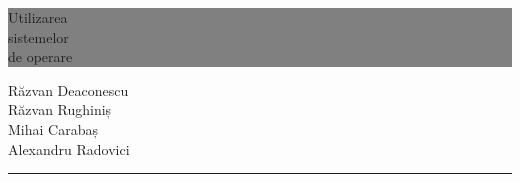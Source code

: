
\begin{titlepage} %


  \colorbox{grey}{
    \parbox[t]{0.93\textwidth}{ %
      \parbox[t]{0.91\textwidth}{ %
        \raggedleft %
        \fontsize{50pt}{80pt}\selectfont %
        \vspace{0.7cm} %

        Utilizarea\\
        sistemelor\\
        de operare\\

        \vspace{0.7cm} %
      }
    }
  }

  \vfill %


  \parbox[t]{0.93\textwidth}{ %
    \raggedleft %
    \Large %
    Răzvan Deaconescu\\[4pt] %
    Răzvan Rughiniș\\[4pt]
    Mihai Carabaș\\[4pt]
    Alexandru Radovici\\[4pt]

    \hfill\rule{0.2\linewidth}{1pt}%
  }

\end{titlepage}
